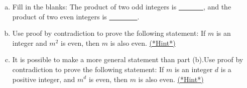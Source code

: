 \begin{exercise}\label{exercise:complex:m2even}
\begin{enumerate}[(a)]
\item
Fill in the blanks:  The product of two odd integers is \underline{~~~~~~~}, and the product of two even integers is \underline{~~~~~~~~}.
\item
Use proof by contradiction to prove the following statement: If $m$ is an integer and $m^2$ is even, then $m$ is also even.
\hyperref[sec:complex:hints]{(*Hint*)}
\item 
It is possible to make a more general statement than part (b).Use proof by contradiction to prove the following statement: If $m$ is an integer $d$ is a positive integer, and $m^d$ is even, then $m$ is also even. 
\hyperref[sec:complex:hints]{(*Hint*)}
\end{enumerate}
\end{exercise}

